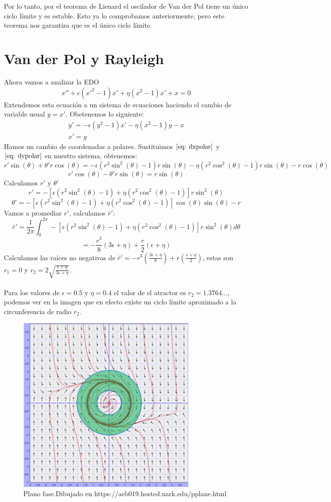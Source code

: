 \documentclass[12pt, a4paper]{report}
\begin{document}
Por lo tanto, por el teorema de Lienard el oscilador de Van der Pol tiene un único ciclo límite y es estable.
Esto ya lo comprobamos anteriormente, pero este teorema nos garantiza que es el único ciclo límite.

\section{Van der Pol y Rayleigh}
Ahora vamos a analizar la EDO
\begin{equation}\label{eq: vdpr}
	x''+\epsilon(x'^2-1)x'+\eta(x^2-1)x'+x=0
\end{equation}
Extendemos esta ecuación a un sistema de ecuaciones haciendo el
cambio de variable usual $y=x'$. Obetenemos lo siguiente:
\begin{equation}\label{eq: vpdrsis}
	\begin{matrix}
		y'=-\epsilon(y^2-1)x'-\eta(x^2-1)y-x \\
		x'=y
	\end{matrix}
\end{equation}
Hamos un cambio de coordenadas a polares. Sustituimos $\eqref{eq: dxpolar}$ y
$\eqref{eq: dypolar}$ en nuestro sistema, obtenemos:
$$r'\sin(\theta)+\theta'r\cos(\theta)=-\epsilon(r^2\sin^2(\theta)-1)r\sin(\theta)-\eta(r^2\cos^2(\theta)-1)r\sin(\theta)-r\cos(\theta)$$
$$r'\cos(\theta)-\theta'r\sin(\theta)=r\sin(\theta)$$
Calculamos $r'$ y $\theta'$
\begin{equation}\label{eq: drvdpr}
	r'=-[\epsilon(r^2\sin^2(\theta)-1)+\eta(r^2\cos^2(\theta)-1)]r\sin^2(\theta)
\end{equation}
$$\theta'=-[\epsilon(r^2\sin^2(\theta)-1)+\eta(r^2\cos^2(\theta)-1)]\cos(\theta)\sin(\theta)-r$$
Vamos a promediar $r'$, calculamos $\bar{r}'$:
$$\bar{r}'=\frac{1}{2\pi}\int_0^{2\pi}-[\epsilon(r^2\sin^2(\theta)-1)+\eta(r^2\cos^2(\theta)-1)]r\sin^2(\theta)d\theta$$
$$=-\frac{r^3}{8}(3\epsilon+\eta)+\frac{r}{2}(\epsilon+\eta)$$
Calculamos las raíces no negativas de $\bar{r}'=-r^3(\frac{3\epsilon+\eta}{8})+r(\frac{\epsilon+\eta}{2})$, estas son
$r_1=0$ y $r_2=2\sqrt{\frac{\epsilon+\eta}{3\epsilon+\eta}}$.\\
\\Para los valores de $\epsilon=0.5$ y $\eta=0.4$ el valor de el atractor es $r_2=1.3764\dots$, podemos ver en la imagen que en efecto
existe un ciclo límite aproximado a la circunferencia de radio $r_2$.

\begin{figure}[h]
	\centering
	\includegraphics[width=9cm]{VDP-R.png}
	\caption{Plano fase.Dibujado en https://aeb019.hosted.uark.edu/pplane.html}
\end{figure}

\newpage
\end{document}
